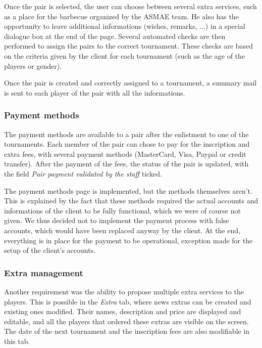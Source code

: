 Once the pair is selected, the user can choose between several extra services,
such as a place for the barbecue organized by the ASMAE team. He also has the
opportunity to leave additional informations (wishes, remarks, ...) in a
special dialogue box at the end of the page. Several automated checks are then
performed to assign the pairs to the correct tournament. These checks are based
on the criteria given by the client for each tournament (such as the age of the
players or gender). \newline

Once the pair is created and correctly assigned to a tournament, a summary mail
is sent to each player of the pair with all the informations.


\subsubsection{Payment methods}
\label{subs:Payment methods}


The payment methods are available to a pair after the enlistment to one of the
tournaments. Each member of the pair can chose to pay for the inscription and
extra fees, with several payment methods (MasterCard, Visa, Paypal or credit
transfer). After the payment of the fees, the status of the pair is updated,
with the field \textit{Pair payment validated by the staff} ticked.\newline

The payment methods page is implemented, but the methods themselves aren't.
This is explained by the fact that these methods required the actual accounts
and informations of the client to be fully functional, which we were of course
not given. We thus decided not to implement the payment process with false
accounts, which would have been replaced anyway by the client. At the end,
everything is in place for the payment to be operational, exception made for
the setup of the client's accounts.

\subsubsection{Extra management}
\label{subs:Extra management}


Another requirement was the ability to propose multiple extra services to the
players. This is possible in the \textit{Extra} tab, where news extras can be
created and existing ones modified. Their names, description and price are
displayed and editable, and all the players that ordered these extras are
visible on the screen. The date of the next tournament and the inscription fees
are also modifiable in this tab.

